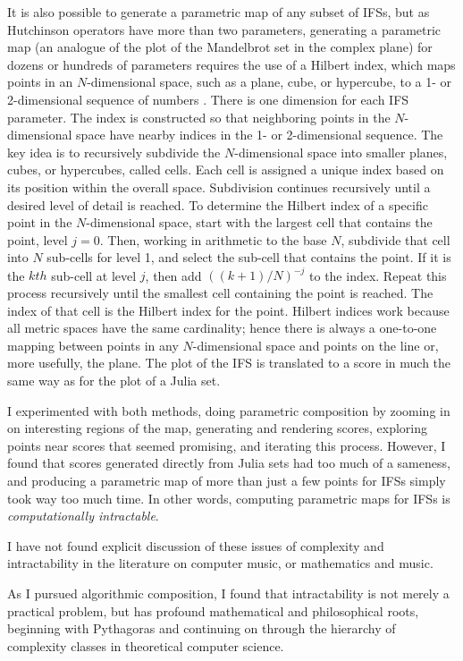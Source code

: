 \documentclass[11pt,papersize=a4]{scrartcl}
\begin{document}
It is also possible to generate a parametric map of any subset of IFSs, but as Hutchinson operators have more than two parameters, generating a parametric map (an analogue of the plot of the Mandelbrot set in the complex plane) for dozens or hundreds of parameters requires the use of a Hilbert index, which maps points in an $N$-dimensional space, such as a plane, cube, or hypercube, to a 1- or 2-dimensional sequence of numbers \parencite{patrick1968mapping}. There is one dimension for each IFS parameter. The index is constructed so that neighboring points in the $N$-dimensional space have nearby indices in the 1- or 2-dimensional sequence. The key idea is to recursively subdivide the $N$-dimensional space into smaller planes, cubes, or hypercubes, called cells. Each cell is assigned a unique index based on its position within the overall space. Subdivision continues recursively until a desired level of detail is reached. To determine the Hilbert index of a specific point in the $N$-dimensional space, start with the largest cell that contains the point, level $j = 0$. Then, working in arithmetic to the base $N$, subdivide that cell into $N$ sub-cells for level 1, and select the sub-cell that contains the point. If it is the $kth$ sub-cell at level $j$, then add $((k + 1)/N)^{-j}$ to the index. Repeat this process recursively until the smallest cell containing the point is reached. The index of that cell is  the Hilbert index for the point. Hilbert indices work because all metric spaces have the same cardinality; hence there is always a one-to-one mapping between points in any $N$-dimensional space and points on the line or, more usefully, the plane. The plot of the IFS is translated to a score in much the same way as for the plot of a Julia set.

I experimented with both methods, doing parametric composition by zooming in on interesting regions of the map, generating and rendering scores, exploring points near scores that seemed promising, and iterating this process. However, I found that scores generated directly from Julia sets had too much of a sameness, and producing a parametric map of more than just a few points for IFSs simply took way too much time. In other words, computing parametric maps for IFSs is \emph{computationally intractable}. 

I have not found explicit discussion of these issues of complexity and intractability in the literature on computer music, or mathematics and music.

As I pursued algorithmic composition, I found that intractability is not merely a practical problem, but has profound mathematical and philosophical roots, beginning with Pythagoras and continuing on through the hierarchy of complexity classes in theoretical computer science. 
\end{document}
